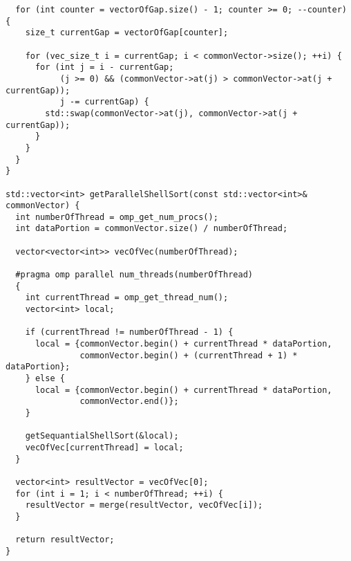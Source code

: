 \documentclass{report}
\begin{document}
\begin{lstlisting}
  for (int counter = vectorOfGap.size() - 1; counter >= 0; --counter) {
    size_t currentGap = vectorOfGap[counter];

    for (vec_size_t i = currentGap; i < commonVector->size(); ++i) {
      for (int j = i - currentGap;
           (j >= 0) && (commonVector->at(j) > commonVector->at(j + currentGap));
           j -= currentGap) {
        std::swap(commonVector->at(j), commonVector->at(j + currentGap));
      }
    }
  }
}

std::vector<int> getParallelShellSort(const std::vector<int>& commonVector) {
  int numberOfThread = omp_get_num_procs();
  int dataPortion = commonVector.size() / numberOfThread;

  vector<vector<int>> vecOfVec(numberOfThread);

  #pragma omp parallel num_threads(numberOfThread)
  {
    int currentThread = omp_get_thread_num();
    vector<int> local;

    if (currentThread != numberOfThread - 1) {
      local = {commonVector.begin() + currentThread * dataPortion,
               commonVector.begin() + (currentThread + 1) * dataPortion};
    } else {
      local = {commonVector.begin() + currentThread * dataPortion,
               commonVector.end()};
    }

    getSequantialShellSort(&local);
    vecOfVec[currentThread] = local;
  }

  vector<int> resultVector = vecOfVec[0];
  for (int i = 1; i < numberOfThread; ++i) {
    resultVector = merge(resultVector, vecOfVec[i]);
  }

  return resultVector;
}
\end{lstlisting}
\end{document}

